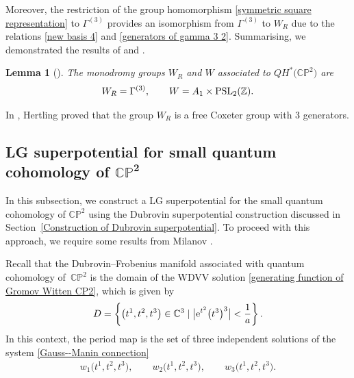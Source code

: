 \documentclass[pdftex]{sigma}
\numberwithin{equation}{section}
\newtheorem{Lemma}[Theorem]{Lemma}
\begin{document}
 Moreover, the restriction of the group homomorphism \eqref{symmetric square representation} to $\Gamma^{(3)}$ provides an isomorphism from $\Gamma^{(3)}$ to $W_R$ due to the relations \eqref{new basis 4} and \eqref{generators of gamma 3 2}. Summarising, we demonstrated the results of \cite[Section~4.1]{Milanov} and \cite[Theorem~5.5]{B.Dubrovin3}.

 \begin{Lemma}[{\cite{B.Dubrovin3,Milanov}}]\label{Monodromy QHCP2}
 The monodromy groups $W_R$ and $W$ associated to $QH^{*}\bigl(\mathbb{CP}^2\bigr)$ are
 \begin{gather*}
 W_R=\Gamma^{(3)}, \qquad W=A_1\times {\rm PSL}_2(\mathbb{Z}).
 \end{gather*}
\end{Lemma}

\begin{Remark}
In \cite[Theorem 5.12\,(g)]{Hertling2}, Hertling proved that the group $W_R$ is a free Coxeter group with 3 generators.
\end{Remark}

\subsection[LG superpotential for small quantum cohomology of $\mathbb{CP}^2$]{LG superpotential for small quantum cohomology of $\boldsymbol{\mathbb{CP}^2}$}\label{LG superpotential for small Quantum Cohomology}

In this subsection, we construct a LG superpotential for the small quantum cohomology of $\mathbb{CP}^2$ using the Dubrovin superpotential construction discussed in Section~\ref{Construction of Dubrovin superpotential}. To proceed with this approach, we require some results from Milanov \cite[Section~4]{Milanov}.


 Recall that the Dubrovin--Frobenius manifold associated with quantum cohomology of~$\mathbb{CP}^2$ is the domain of the WDVV solution \eqref{generating function of Gromov Witten CP2}, which is given by
 \begin{gather}\label{domain Quantum cohomology 1}
 D=\left\{ \bigl(t^1,t^2,t^3\bigr)\in \mathbb{C}^3\mid \bigl|{\rm e}^{t^2}\bigl(t^3\bigr)^3\bigr|<\frac{1}{a}\right\}.
 \end{gather}
 In this context, the period map is the set of three independent solutions of the system \eqref{Gauss--Manin connection}
\begin{gather}\label{period of quantum cohomology cp2}
w_1\bigl(t^1,t^2,t^3\bigr), \qquad w_2\bigl(t^1,t^2,t^3\bigr), \qquad w_3\bigl(t^1,t^2,t^3\bigr).
\end{gather}
\end{document}

